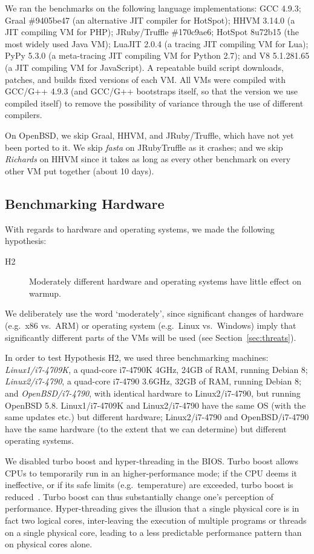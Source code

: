 \documentclass[preprint,numbers,10pt]{sigplanconf}
\newcommand{\hyptwo}{H2\xspace}
\newcommand{\richards}{\emph{Richards}\xspace}
\newcommand{\fasta}{\emph{fasta}\xspace}
\newcommand{\bencherthree}{Linux1/i7-4709K\xspace}
\newcommand{\bencherfive}{Linux2/i7-4790\xspace}
\newcommand{\benchersix}{OpenBSD/i7-4790\xspace}
\begin{document}
We ran the benchmarks on the following language implementations: GCC 4.9.3;
Graal \#9405be47 (an alternative JIT compiler for HotSpot); HHVM 3.14.0 (a JIT
compiling VM for PHP); JRuby/Truffle \#170c9ae6; HotSpot 8u72b15 (the most widely used Java
VM); LuaJIT 2.0.4 (a tracing JIT compiling VM for Lua); PyPy 5.3.0 (a
meta-tracing JIT compiling VM for Python 2.7); and V8 5.1.281.65 (a JIT
compiling VM for JavaScript). A repeatable build script downloads, patches,
and builds fixed versions of each VM. All VMs were compiled with GCC/G++ 4.9.3
(and GCC/G++ bootstraps itself, so that the version we use compiled itself)
to remove the possibility of variance through the use of different compilers.

On OpenBSD, we skip Graal, HHVM, and JRuby/Truffle, which have not yet been
ported to it. We skip \fasta on JRubyTruffle as it crashes;
and we skip \richards on HHVM since it takes as long as every other benchmark
on every other VM put together (about 10 days).


\subsection{Benchmarking Hardware}

With regards to hardware and operating systems, we made the
following hypothesis:
\begin{description}
  \item[\hyptwo] Moderately different hardware and operating systems have little effect on warmup.
\end{description}
We deliberately use the word `moderately', since significant changes of hardware
(e.g.~x86 vs.~ARM) or operating system (e.g.~Linux vs.~Windows) imply that
significantly different parts of the VMs will be used (see Section~\ref{sec:threats}).

In order to test Hypothesis H2, we used three benchmarking machines: \emph{\bencherthree}, a quad-core i7-4790K
4GHz, 24GB of RAM, running Debian 8; \emph{\bencherfive}, a quad-core i7-4790
3.6GHz, 32GB of RAM, running Debian 8; and \emph{\benchersix}, with identical
hardware to \bencherfive, but running OpenBSD 5.8. \bencherthree and \bencherfive
have the same OS (with the same updates etc.) but different hardware; \bencherfive
and \benchersix have the same hardware (to the extent that we can determine)
but different operating systems.

We disabled turbo boost and hyper-threading in the BIOS. Turbo boost
allows CPUs to temporarily run in an higher-performance
mode; if the CPU deems it ineffective, or if its safe limits (e.g.~temperature) are exceeded,
turbo boost is reduced~\cite{charles09turboboost}. Turbo boost
can thus substantially change one's
perception of performance. Hyper-threading gives the illusion that a single
physical core is in fact two logical cores, inter-leaving the
execution of multiple programs or threads on a single physical core,
leading to a less predictable performance pattern
than on physical cores alone.
\end{document}
